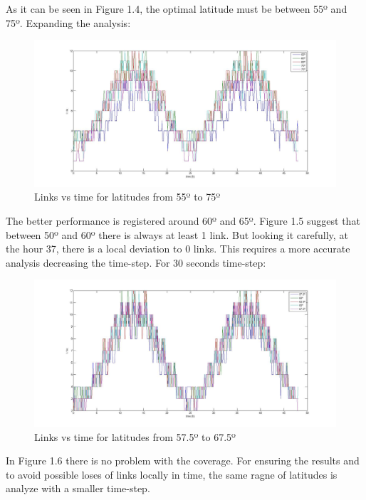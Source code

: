 As it can be seen in Figure 1.4, the optimal latitude must be between 55º and 75º. Expanding the analysis:
\begin{figure}[H]
\begin{center}
\includegraphics[scale=0.30]{55_5_75_lat.jpg}
\caption{Links vs time for latitudes from 55º to 75º}
\end{center}
\end{figure}
The better performance is registered around 60º and 65º. Figure 1.5 suggest that between 50º and 60º there is always at least 1 link. But looking it carefully, at the hour 37, there is a local deviation to 0 links. This requires a more accurate analysis decreasing the time-step. For 30 seconds time-step:
\begin{figure}[H]
\begin{center}
\includegraphics[scale=0.30]{575_25_675_lat.jpg}
\caption{Links vs time for latitudes from 57.5º to 67.5º}
\end{center}
\end{figure}
In Figure 1.6 there is no problem with the coverage. For ensuring the results and to avoid possible loses of links locally in time, the same ragne of latitudes is analyze with a smaller time-step.
